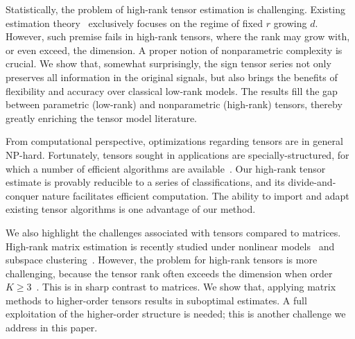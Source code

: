 \documentclass{article}
\theoremstyle{plain}
\theoremstyle{definition}
\begin{document}
Statistically, the problem of high-rank tensor estimation is challenging. Existing estimation theory~\citep{anandkumar2014tensor,montanari2018spectral,cai2019nonconvex} exclusively focuses on the regime of fixed $r$ growing $d$. However, such premise fails in high-rank tensors, where the rank may grow with, or even exceed, the dimension. A proper notion of nonparametric complexity is crucial. We show that, somewhat surprisingly, the sign tensor series not only preserves all information in the original signals, but also brings the benefits of flexibility and accuracy over classical low-rank models. The results fill the gap between parametric (low-rank) and nonparametric (high-rank) tensors, thereby greatly enriching the tensor model literature. 

From computational perspective, optimizations regarding tensors are in general NP-hard. Fortunately, tensors sought in applications are specially-structured, for which a number of efficient algorithms are available~\citep{ghadermarzy2018learning,wang2018learning, han2020optimal}. Our high-rank tensor estimate is provably reducible to a series of classifications, and its divide-and-conquer nature facilitates efficient computation. The ability to import and adapt existing tensor algorithms is one advantage of our method. 

We also highlight the challenges associated with tensors compared to matrices. High-rank matrix estimation is recently studied under nonlinear models~\citep{ganti2015matrix} and subspace clustering~\citep{pmlr-v70-ongie17a,fan2019online}. However, the problem for high-rank tensors is more challenging, because the tensor rank often exceeds the dimension when order $K\geq 3$~\citep{anandkumar2017analyzing}. This is in sharp contrast to matrices. We show that, applying matrix methods to higher-order tensors results in suboptimal estimates. A full exploitation of the higher-order structure is needed; this is another challenge we address in this paper.
\end{document}
